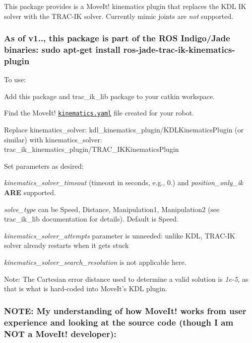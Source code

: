 This package provides is a Move\-It! kinematics plugin that replaces the K\-D\-L I\-K solver with the T\-R\-A\-C-\/\-I\-K solver. Currently mimic joints are {\itshape not} supported.

\subsubsection*{As of v1.., this package is part of the R\-O\-S Indigo/\-Jade binaries\-: {\ttfamily sudo apt-\/get install ros-\/jade-\/trac-\/ik-\/kinematics-\/plugin}}

To use\-:


\begin{DoxyItemize}
\item Add this package and trac\-\_\-ik\-\_\-lib package to your catkin workspace.
\item Find the Move\-It! \href{http://docs.ros.org/indigo/api/pr2_moveit_tutorials/html/kinematics/src/doc/kinematics_configuration.html}{\tt kinematics.\-yaml} file created for your robot.
\item Replace {\ttfamily kinematics\-\_\-solver\-: kdl\-\_\-kinematics\-\_\-plugin/\-K\-D\-L\-Kinematics\-Plugin} (or similar) with {\ttfamily kinematics\-\_\-solver\-: trac\-\_\-ik\-\_\-kinematics\-\_\-plugin/\-T\-R\-A\-C\-\_\-\-I\-K\-Kinematics\-Plugin}
\item Set parameters as desired\-:
\begin{DoxyItemize}
\item {\itshape kinematics\-\_\-solver\-\_\-timeout} (timeout in seconds, e.\-g., 0.) and {\itshape position\-\_\-only\-\_\-ik} {\bfseries A\-R\-E} supported.
\item {\itshape solve\-\_\-type} can be Speed, Distance, Manipulation1, Manipulation2 (see trac\-\_\-ik\-\_\-lib documentation for details). Default is Speed.
\item {\itshape kinematics\-\_\-solver\-\_\-attempts} parameter is unneeded\-: unlike K\-D\-L, T\-R\-A\-C-\/\-I\-K solver already restarts when it gets stuck
\item {\itshape kinematics\-\_\-solver\-\_\-search\-\_\-resolution} is not applicable here.
\item Note\-: The Cartesian error distance used to determine a valid solution is {\itshape 1e-\/5}, as that is what is hard-\/coded into Move\-It's K\-D\-L plugin.
\end{DoxyItemize}
\end{DoxyItemize}

\subsubsection*{N\-O\-T\-E\-: My understanding of how Move\-It! works from user experience and looking at the source code (though I am N\-O\-T a Move\-It! developer)\-:}

